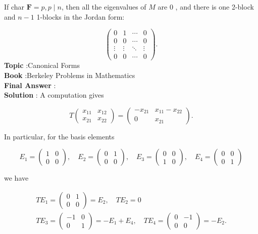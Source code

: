 \documentclass[10pt]{article}
\begin{document}
If char $\mathbf{F}=p, p \mid n$, then all the eigenvalues of $M$ are 0 , and there is one 2-block and $n-1$ 1-blocks in the Jordan form:

$$
\left(\begin{array}{cccc}
0 & 1 & \cdots & 0 \\
0 & 0 & \cdots & 0 \\
\vdots & \vdots & \ddots & \vdots \\
0 & 0 & \cdots & 0
\end{array}\right) .
$$
\textbf{Topic} :Canonical Forms \\
\textbf{Book} :Berkeley Problems in Mathematics\\
\textbf{Final Answer} :\\


\textbf{Solution} : A computation gives

$$
T\left(\begin{array}{ll}
x_{11} & x_{12} \\
x_{21} & x_{22}
\end{array}\right)=\left(\begin{array}{cc}
-x_{21} & x_{11}-x_{22} \\
0 & x_{21}
\end{array}\right) .
$$

In particular, for the basis elements

$$
E_{1}=\left(\begin{array}{ll}
1 & 0 \\
0 & 0
\end{array}\right), \quad E_{2}=\left(\begin{array}{ll}
0 & 1 \\
0 & 0
\end{array}\right), \quad E_{3}=\left(\begin{array}{ll}
0 & 0 \\
1 & 0
\end{array}\right), \quad E_{4}=\left(\begin{array}{ll}
0 & 0 \\
0 & 1
\end{array}\right)
$$

we have

$$
\begin{gathered}
T E_{1}=\left(\begin{array}{ll}
0 & 1 \\
0 & 0
\end{array}\right)=E_{2}, \quad T E_{2}=0 \\
T E_{3}=\left(\begin{array}{cc}
-1 & 0 \\
0 & 1
\end{array}\right)=-E_{1}+E_{4}, \quad T E_{4}=\left(\begin{array}{cc}
0 & -1 \\
0 & 0
\end{array}\right)=-E_{2} .
\end{gathered}
$$
\end{document}
